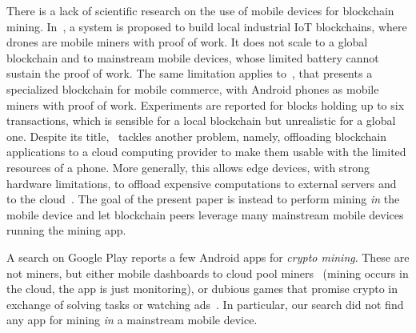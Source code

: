 There is a lack of scientific research on the use of mobile devices for blockchain mining.
In~\cite{LeePSB20}, a system is proposed to build local
industrial IoT blockchains, where drones are mobile miners
with proof of work. It does not scale
to a global blockchain and to mainstream mobile devices, whose limited battery
cannot sustain the proof of work.
The same limitation applies to~\cite{SuankaewmaneeHN18}, that
presents a specialized blockchain for mobile commerce, with Android phones as
mobile miners with proof of work.
Experiments are reported for blocks holding up to six transactions, which is
sensible for a local blockchain but unrealistic for a global one.
Despite its title, \cite{JiangLW22}~tackles another problem, namely,
offloading blockchain applications
to a cloud computing provider to make them usable
with the limited resources of a phone.
More generally, this allows edge devices, with strong hardware limitations,
to offload expensive computations
to external servers and to the cloud~\cite{SoundararajS25}.
The goal of the present paper is instead to perform mining \emph{in} the mobile device
and let blockchain peers leverage many
mainstream mobile devices running the mining app.

A search on Google Play reports a few Android apps for
\emph{crypto mining}. These are not miners, but either
mobile dashboards to cloud pool miners~\cite{ctpool-google-play,viabtc-google-play,ecos-google-play,cloudminingbitcoincrypto-google-play,minex-google-play} (mining occurs in the cloud,
the app is just monitoring),
or dubious games that promise crypto in exchange of solving tasks
or watching ads~\cite{bitcoinminerearnrealcrypto-google-play,cryptofortunetycoonbtcminer-google-play}.
In particular, our search did not find any app for mining \emph{in} a mainstream mobile device.
